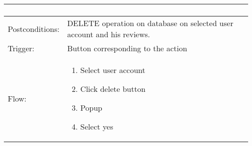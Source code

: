 \begin{longtable}{| p{3.5cm} | p{9cm} |}
\begin{enumerate}
\end{enumerate}\\
\hline
Postconditions: & DELETE operation on database on selected user account and his reviews.\\
\hline
Trigger: & Button corresponding to the action\\
\hline
Flow: &\mbox{}\par\vspace{-\baselineskip}
\begin{enumerate}
\item Select user account
\item Click delete button
\item Popup
\item Select yes 
\end{enumerate}\\
\hline
\end{longtable}


